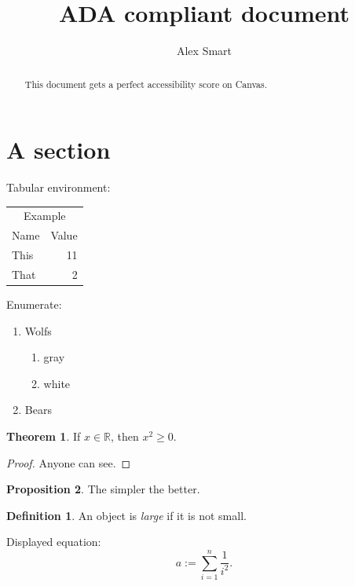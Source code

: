 \documentclass[10pt]{amsart}
\theoremstyle{definition}
\newtheorem{theorem}{Theorem}[section]
\newtheorem{proposition}[theorem]{Proposition}
\theoremstyle{definition}
\newtheorem{definition}{Definition}[section]
\begin{document}
\title{ADA compliant document}
\author{Alex Smart}

\begin{abstract}
This document gets a perfect accessibility score on Canvas.
\end{abstract}

\maketitle

\section{A section}


Tabular environment:
\begin{center}
\begin{tabular}{|l|r|}
\multicolumn{2}{c}{Example}\\
Name & Value\\
This & 11 \\
That & 2
\end{tabular}
\end{center}

Enumerate:

\begin{enumerate}[start=7]
\item Wolfs
  \begin{enumerate}
  \item gray
  \item white
  \end{enumerate}
\item Bears
\end{enumerate}

\begin{theorem}
\label{thm:sq}
If $x\in\mathbb{R}$, then $x^{2} \geq 0$. 
\end{theorem}

\begin{proof}
Anyone can see.
\end{proof}

\begin{proposition}
The simpler the better.
\end{proposition}

\begin{definition}
An object is \emph{large} if it is not small.
\end{definition}

Displayed equation: 
$$
a:=\sum_{i=1}^n\frac{1}{i^2}.
$$
\end{document}
